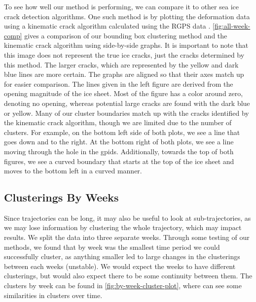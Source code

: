 \documentclass[12pt]{article}
\begin{document}
To see how well our method is performing, we can compare it to other sea
ice crack detection algorithms. One such method is by plotting the
deformation data using a kinematic crack algorithm calculated using the
RGPS data \citep{peterson_evaluating_2011}. \cref{fig:all-week-comp}
gives a comparison of our bounding box clustering method and the
kinematic crack algorithm using side-by-side graphs. It is important to
note that this image does not represent the true ice cracks, just the
cracks determined by this method. The larger cracks, which are
represented by the yellow and dark blue lines are more certain. The
graphs are aligned so that their axes match up for easier comparison.
The lines given in the left figure are derived from the opening
magnitude of the ice sheet. Most of the figure has a color around zero,
denoting no opening, whereas potential large cracks are found with the
dark blue or yellow. Many of our cluster boundaries match up with the
cracks identified by the kinematic crack algorithm, though we are
limited due to the number of clusters. For example, on the bottom left
side of both plots, we see a line that goes down and to the right. At
the bottom right of both plots, we see a line moving through the hole in
the gpids. Additionally, towards the top of both figures, we see a
curved boundary that starts at the top of the ice sheet and moves to the
bottom left in a curved manner.

\hypertarget{clusterings-by-weeks}{%
\subsection{Clusterings By Weeks}\label{clusterings-by-weeks}}

Since trajectories can be long, it may also be useful to look at
sub-trajectories, as we may lose information by clustering the whole
trajectory, which may impact results. We split the data into three
separate weeks. Through some testing of our methods, we found that by
week was the smallest time period we could successfully cluster, as
anything smaller led to large changes in the clusterings between each
weeks (unstable). We would expect the weeks to have different
clusterings, but would also expect there to be some continuity between
them. The clusters by week can be found in
\cref{fig:by-week-cluster-plot}, where can see some similarities in
clusters over time.
\end{document}
